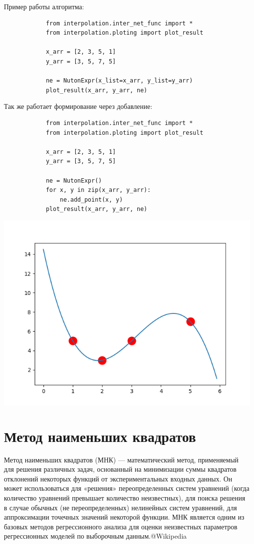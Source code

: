 \documentclass[12pt]{article} %
\begin{document}
		 Пример работы алгоритма:
		 \begin{verbatim}
		 	from interpolation.inter_net_func import *
		 	from interpolation.ploting import plot_result
		 	
		 	x_arr = [2, 3, 5, 1]
		 	y_arr = [3, 5, 7, 5]
		 	
		 	ne = NutonExpr(x_list=x_arr, y_list=y_arr)
		 	plot_result(x_arr, y_arr, ne)
		 \end{verbatim}
	 Так же работает формирование через добавление:
	        \begin{verbatim}
		 	from interpolation.inter_net_func import *
		 	from interpolation.ploting import plot_result
			 
		 	x_arr = [2, 3, 5, 1]
		 	y_arr = [3, 5, 7, 5]
			 
		 	ne = NutonExpr()
		 	for x, y in zip(x_arr, y_arr):
		 	    ne.add_point(x, y)
		 	plot_result(x_arr, y_arr, ne)
		   \end{verbatim}
	 	\includegraphics{5}
 		\section{Метод наименьших квадратов}
 		Метод наименьших квадратов (МНК) — математический метод, применяемый для решения различных задач, основанный на минимизации суммы квадратов отклонений некоторых функций от экспериментальных входных данных. Он может использоваться для «решения» переопределенных систем уравнений (когда количество уравнений превышает количество неизвестных), для поиска решения в случае обычных (не переопределенных) нелинейных систем уравнений, для аппроксимации точечных значений некоторой функции. МНК является одним из базовых методов регрессионного анализа для оценки неизвестных параметров регрессионных моделей по выборочным данным.@Wikipedia
 		
\end{document}
